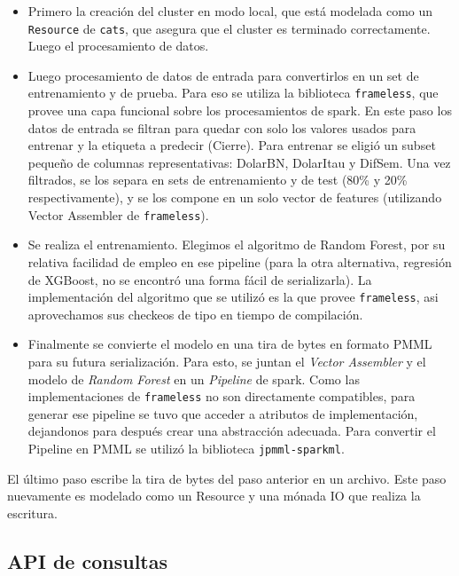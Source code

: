 \documentclass[10pt,spanish,a4paper,]{article}
\providecommand{\tightlist}{%
  \setlength{\itemsep}{0pt}\setlength{\parskip}{0pt}}
\begin{document}
\begin{itemize}
\tightlist
\item
  Primero la creación del cluster en modo local, que está modelada como
  un \texttt{Resource} de \texttt{cats}, que asegura que el cluster es
  terminado correctamente. Luego el procesamiento de datos.
\item
  Luego procesamiento de datos de entrada para convertirlos en un set de
  entrenamiento y de prueba. Para eso se utiliza la biblioteca
  \texttt{frameless}, que provee una capa funcional sobre los
  procesamientos de spark. En este paso los datos de entrada se filtran
  para quedar con solo los valores usados para entrenar y la etiqueta a
  predecir (Cierre). Para entrenar se eligió un subset pequeño de
  columnas representativas: DolarBN, DolarItau y DifSem. Una vez
  filtrados, se los separa en sets de entrenamiento y de test (80\% y
  20\% respectivamente), y se los compone en un solo vector de features
  (utilizando Vector Assembler de \texttt{frameless}).
\item
  Se realiza el entrenamiento. Elegimos el algoritmo de Random Forest,
  por su relativa facilidad de empleo en ese pipeline (para la otra
  alternativa, regresión de XGBoost, no se encontró una forma fácil de
  serializarla). La implementación del algoritmo que se utilizó es la
  que provee \texttt{frameless}, asi aprovechamos sus checkeos de tipo
  en tiempo de compilación.
\item
  Finalmente se convierte el modelo en una tira de bytes en formato PMML
  para su futura serialización. Para esto, se juntan el \emph{Vector
  Assembler} y el modelo de \emph{Random Forest} en un \emph{Pipeline}
  de spark. Como las implementaciones de \texttt{frameless} no son
  directamente compatibles, para generar ese pipeline se tuvo que
  acceder a atributos de implementación, dejandonos para después crear
  una abstracción adecuada. Para convertir el Pipeline en PMML se
  utilizó la biblioteca \texttt{jpmml-sparkml}.
\end{itemize}

El último paso escribe la tira de bytes del paso anterior en un archivo.
Este paso nuevamente es modelado como un Resource y una mónada IO que
realiza la escritura.

\hypertarget{api-de-consultas}{%
\subsection{API de consultas}\label{api-de-consultas}}
\end{document}

